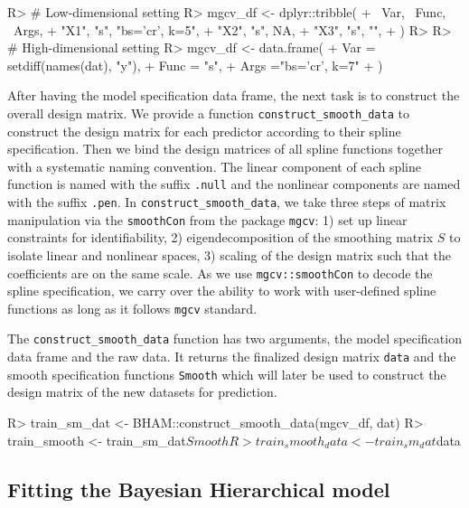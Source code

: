 \documentclass[
]{jss}
\begin{document}
\begin{CodeChunk}
\begin{CodeInput}
R> # Low-dimensional setting
R> mgcv_df <- dplyr::tribble(
+   ~Var, ~Func, ~Args,
+   "X1",  "s", "bs='cr', k=5",
+   "X2",  "s", NA,
+   "X3",  "s", "",
+ )
R> 
R> # High-dimensional setting
R> mgcv_df <- data.frame(
+   Var = setdiff(names(dat), "y"),
+   Func = "s",
+   Args ="bs='cr', k=7"
+ )
\end{CodeInput}
\end{CodeChunk}

After having the model specification data frame, the next task is to
construct the overall design matrix. We provide a function
\texttt{construct\_smooth\_data} to construct the design matrix for each
predictor according to their spline specification. Then we bind the
design matrices of all spline functions together with a systematic
naming convention. The linear component of each spline function is named
with the suffix \texttt{.null} and the nonlinear components are named
with the suffix \texttt{.pen}. In \texttt{construct\_smooth\_data}, we
take three steps of matrix manipulation via the \texttt{smoothCon} from
the package \texttt{mgcv}: 1) set up linear constraints for
identifiability, 2) eigendecomposition of the smoothing matrix \(S\) to
isolate linear and nonlinear spaces, 3) scaling of the design matrix
such that the coefficients are on the same scale. As we use
\texttt{mgcv::smoothCon} to decode the spline specification, we carry
over the ability to work with user-defined spline functions as long as
it follows \texttt{mgcv} standard.

The \texttt{construct\_smooth\_data} function has two arguments, the
model specification data frame and the raw data. It returns the
finalized design matrix \texttt{data} and the smooth specification
functions \texttt{Smooth} which will later be used to construct the
design matrix of the new datasets for prediction.

\begin{CodeChunk}
\begin{CodeInput}
R> train_sm_dat <- BHAM::construct_smooth_data(mgcv_df, dat)
R> train_smooth <- train_sm_dat$Smooth
R> train_smooth_data <- train_sm_dat$data
\end{CodeInput}
\end{CodeChunk}

\subsection{Fitting the Bayesian Hierarchical model}
\end{document}
